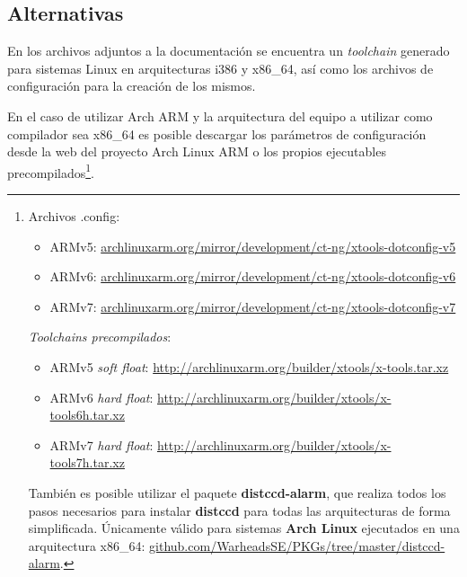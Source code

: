 \documentclass{article}
\begin{document}
\subsection{Alternativas}

En los archivos adjuntos a la documentación se encuentra un \textit{toolchain} generado para sistemas Linux en arquitecturas i386 y x86\_64, así como los archivos de configuración para la creación de los mismos.

En el caso de utilizar Arch ARM y la arquitectura del equipo a utilizar como compilador sea x86\_64 es posible descargar los parámetros de configuración desde la web del proyecto Arch Linux ARM o los propios ejecutables precompilados\footnote{Archivos .config:
\begin{itemize}
\item ARMv5: \href{http://archlinuxarm.org/mirror/development/ct-ng/xtools-dotconfig-v5}{archlinuxarm.org/mirror/development/ct-ng/xtools-dotconfig-v5}
\item ARMv6: \href{http://archlinuxarm.org/mirror/development/ct-ng/xtools-dotconfig-v6}{archlinuxarm.org/mirror/development/ct-ng/xtools-dotconfig-v6}
\item ARMv7: \href{http://archlinuxarm.org/mirror/development/ct-ng/xtools-dotconfig-v7}{archlinuxarm.org/mirror/development/ct-ng/xtools-dotconfig-v7}
\end{itemize}
\textit{Toolchains precompilados}:
\begin{itemize}
\item ARMv5 \textit{soft float}: \href{http://archlinuxarm.org/builder/xtools/x-tools.tar.xz}{http://archlinuxarm.org/builder/xtools/x-tools.tar.xz}
\item ARMv6 \textit{hard float}: \href{http://archlinuxarm.org/builder/xtools/x-tools6h.tar.xz}{http://archlinuxarm.org/builder/xtools/x-tools6h.tar.xz}
\item ARMv7 \textit{hard float}: \href{http://archlinuxarm.org/builder/xtools/x-tools7h.tar.xz}{http://archlinuxarm.org/builder/xtools/x-tools7h.tar.xz}
\end{itemize}
También es posible utilizar el paquete \textbf{distccd-alarm}, que realiza todos los pasos necesarios para instalar \textbf{distccd} para todas las arquitecturas de forma simplificada. Únicamente válido para sistemas \textbf{Arch Linux} ejecutados en una arquitectura x86\_64: \href{https://github.com/WarheadsSE/PKGs/tree/master/distccd-alarm}{github.com/WarheadsSE/PKGs/tree/master/distccd-alarm}.
}.
\end{document}
